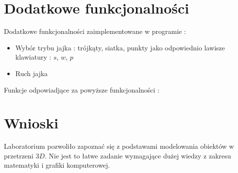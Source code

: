 \documentclass[wide,a4paper,titlepage,12pt] {article}
\begin{document}
\section{Dodatkowe funkcjonalności}
Dodatkowe funkcjonalności zaimplementowane w programie :
\begin{itemize}
	\item Wybór trybu jajka : trójkąty, siatka, punkty jako odpowiednio lawisze klawiatury : $s$, $w$, $p$
	\item Ruch jajka 
\end{itemize}
Funkcje odpowiadjące za powyższe funkcjonalności :
\lstset{ %
    language=c++,                %
    basicstyle=\scriptsize,       %
    numbers=left,                   %
    numberstyle=\scriptsize,      %
    stepnumber=10,                   %
    numbersep=9pt,                  %
    showspaces=false,               %
    showstringspaces=false,         %
    showtabs=false,                 %
    breaklines=true,                %
    }
    
\section{Wnioski}
Laboratorium pozwoliło zapoznać się z podstawami modelowania obiektów w przetrzeni $3D$. Nie jest to łatwe zadanie wymagające dużej wiedzy z zakresu matematyki i grafiki komputerowej.
\end{document}
